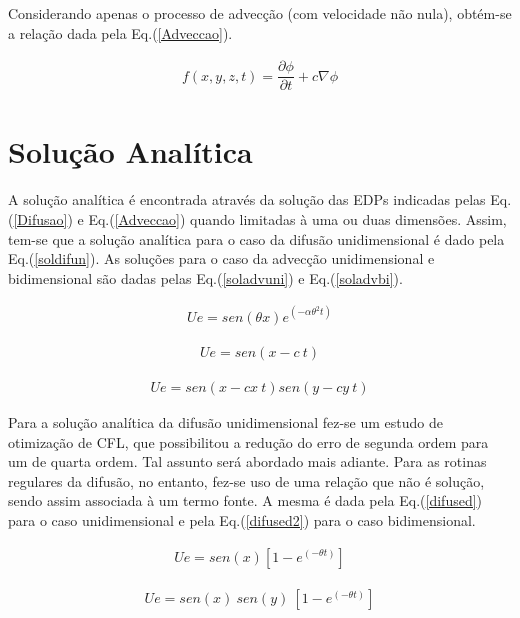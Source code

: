 	Considerando apenas o processo de advecção (com velocidade não nula), obtém-se a relação dada pela Eq.(\ref{Adveccao}).
	
\begin{align}
\label{Adveccao}
f(x,y,z,t) = \dfrac{\partial \phi}{\partial t} + c \nabla \phi
\end{align}

\section{Solução Analítica}

\noindent

	A solução analítica é encontrada através da solução das EDPs indicadas pelas Eq.(\ref{Difusao}) e Eq.(\ref{Adveccao}) quando limitadas à uma ou duas dimensões. Assim, tem-se que a solução analítica para o caso da difusão unidimensional é dado pela Eq.(\ref{soldifun}). As soluções para o caso da advecção unidimensional e bidimensional são dadas pelas Eq.(\ref{soladvuni}) e Eq.(\ref{soladvbi}).
	
\begin{align}
\label{soldifun}
Ue = sen(\theta x) e^{(-\alpha \theta^2 t)}
\end{align}

\begin{align}
\label{soladvuni}
Ue = sen(x - c \ t)
\end{align}

\begin{align}
\label{soladvbi}
Ue = sen(x - cx \ t)sen(y - cy \ t)
\end{align}

	Para a solução analítica da difusão unidimensional fez-se um estudo de otimização de CFL, que possibilitou a redução do erro de segunda ordem para um de quarta ordem. Tal assunto será abordado mais adiante. Para as rotinas regulares da difusão, no entanto, fez-se uso de uma relação que não é solução, sendo assim associada à um termo fonte. A mesma é dada pela Eq.(\ref{difused}) para o caso unidimensional e pela Eq.(\ref{difused2}) para o caso bidimensional.
	
\begin{align}
\label{difused}
Ue = sen(x)[1- e^{(-\theta t)}]
\end{align}

\begin{align}
\label{difused2}
Ue = sen(x) \ sen(y)\ [1- e^{(-\theta t)}] 
\end{align}

